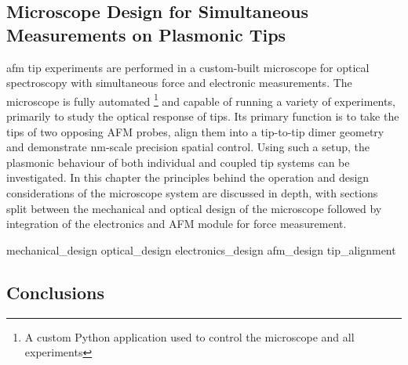 \documentclass[12pt, a4paper, oneside]{book}
\begin{document}
\begin{singlespace}
\color{white}\chapter{Microscope Design for Simultaneous Measurements on Plasmonic Tips}
\end{singlespace}


\Gls{afm} tip experiments are performed in a custom-built microscope for optical spectroscopy with simultaneous force and electronic measurements. The microscope is fully automated%
\footnote{A custom Python application used to control the microscope and all experiments}
and capable of running a variety of experiments, primarily to study the optical response of tips. Its primary function is to take the tips of two opposing AFM probes, align them into a tip-to-tip dimer geometry and demonstrate nm-scale precision spatial control. Using such a setup, the plasmonic behaviour of both individual and coupled tip systems can be investigated. In this chapter the principles behind the operation and design considerations of the microscope system are discussed in depth, with sections split between the mechanical and optical design of the microscope followed by integration of the electronics and AFM module for force measurement.

{mechanical_design}
{optical_design}
{electronics_design}
{afm_design}
{tip_alignment}

\section{Conclusions}
\end{document}
